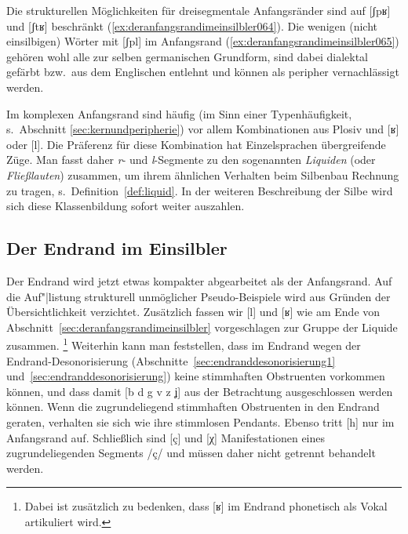 Die strukturellen Möglichkeiten für dreisegmentale Anfangsränder sind auf [ʃpʁ] und [ʃtʁ] beschränkt (\ref{ex:deranfangsrandimeinsilbler064}).
Die wenigen (nicht einsilbigen) Wörter mit [ʃpl] im Anfangsrand (\ref{ex:deranfangsrandimeinsilbler065}) gehören wohl alle zur selben germanischen Grundform, sind dabei dialektal gefärbt bzw.\ aus dem Englischen entlehnt und können als peripher vernachlässigt werden.

\begin{exe}
  \ex\label{ex:deranfangsrandimeinsilbler063}
  \begin{xlist}
  \end{xlist}
\end{exe}

Im komplexen Anfangsrand sind häufig (im Sinn einer Typenhäufigkeit, s.\ Abschnitt \ref{sec:kernundperipherie}) vor allem Kombinationen aus Plosiv und [ʁ] oder [l].
Die Präferenz für diese Kombination hat Einzelsprachen übergreifende Züge.
Man fasst daher \textit{r}- und \textit{l}-Segmente zu den sogenannten \textit{Liquiden} (oder \textit{Fließlauten}) zusammen, um ihrem ähnlichen Verhalten beim Silbenbau Rechnung zu tragen, s.\ Definition~\ref{def:liquid}.
In der weiteren Beschreibung der Silbe wird sich diese Klassenbildung sofort weiter auszahlen.


\subsection{Der Endrand im Einsilbler}
\label{sec:derendrandimeinsilbler}

Der Endrand wird jetzt etwas kompakter abgearbeitet als der Anfangsrand.
Auf die Auf"|listung strukturell unmöglicher Pseudo-Beispiele wird aus Gründen der Übersichtlichkeit verzichtet.
Zusätzlich fassen wir [l] und [ʁ] wie am Ende von Abschnitt~\ref{sec:deranfangsrandimeinsilbler} vorgeschlagen zur Gruppe der Liquide zusammen.%
\footnote{Dabei ist zusätzlich zu bedenken, dass [ʁ] im Endrand phonetisch als Vokal artikuliert wird.}
Weiterhin kann man feststellen, dass im Endrand wegen der Endrand-Desonorisierung (Abschnitte~\ref{sec:endranddesonorisierung1} und~\ref{sec:endranddesonorisierung}) keine stimmhaften Obstruenten vorkommen können, und dass damit [b d g v z ʝ] aus der Betrachtung ausgeschlossen werden können.
Wenn die zugrundeliegend stimmhaften Obstruenten in den Endrand geraten, verhalten sie sich wie ihre stimmlosen Pendants.
Ebenso tritt [h] nur im Anfangsrand auf.
Schließlich sind [ç] und [χ] Manifestationen eines zugrundeliegenden Segments /ç/ und müssen daher nicht getrennt behandelt werden.

